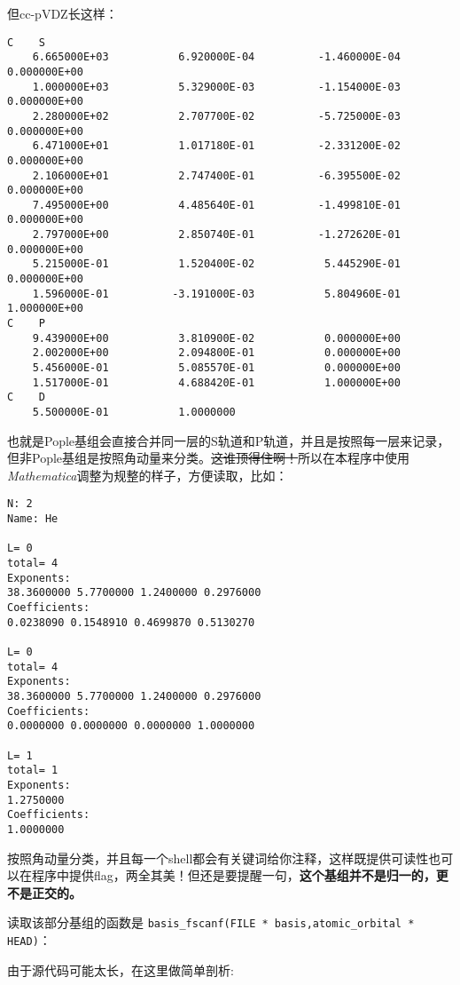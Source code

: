 \documentclass[12pt,a4paper,openany,twoside]{article}
\numberwithin{equation}{section}
\begin{document}
            但cc-pVDZ长这样：

            \begin{lstlisting}
C    S
    6.665000E+03           6.920000E-04          -1.460000E-04           0.000000E+00
    1.000000E+03           5.329000E-03          -1.154000E-03           0.000000E+00
    2.280000E+02           2.707700E-02          -5.725000E-03           0.000000E+00
    6.471000E+01           1.017180E-01          -2.331200E-02           0.000000E+00
    2.106000E+01           2.747400E-01          -6.395500E-02           0.000000E+00
    7.495000E+00           4.485640E-01          -1.499810E-01           0.000000E+00
    2.797000E+00           2.850740E-01          -1.272620E-01           0.000000E+00
    5.215000E-01           1.520400E-02           5.445290E-01           0.000000E+00
    1.596000E-01          -3.191000E-03           5.804960E-01           1.000000E+00
C    P
    9.439000E+00           3.810900E-02           0.000000E+00
    2.002000E+00           2.094800E-01           0.000000E+00
    5.456000E-01           5.085570E-01           0.000000E+00
    1.517000E-01           4.688420E-01           1.000000E+00
C    D
    5.500000E-01           1.0000000
            \end{lstlisting}
            也就是Pople基组会直接合并同一层的S轨道和P轨道，并且是按照每一层来记录，但非Pople基组是按照角动量来分类。\sout{这谁顶得住啊！}所以在本程序中使用\emph{Mathematica}调整为规整的样子，方便读取，比如：

            \begin{lstlisting}
N: 2
Name: He

L= 0
total= 4
Exponents:
38.3600000 5.7700000 1.2400000 0.2976000
Coefficients:
0.0238090 0.1548910 0.4699870 0.5130270

L= 0
total= 4
Exponents:
38.3600000 5.7700000 1.2400000 0.2976000
Coefficients:
0.0000000 0.0000000 0.0000000 1.0000000

L= 1
total= 1
Exponents:
1.2750000
Coefficients:
1.0000000
            \end{lstlisting}

            按照角动量分类，并且每一个shell都会有关键词给你注释，这样既提供可读性也可以在程序中提供flag，两全其美！但还是要提醒一句，\textbf{这个基组并不是归一的，更不是正交的。}

            读取该部分基组的函数是 \lstinline$basis_fscanf(FILE * basis,atomic_orbital * HEAD)$：
            
            
            由于源代码可能太长，在这里做简单剖析:
\end{document}
